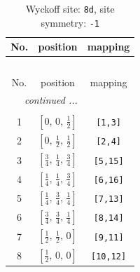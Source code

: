 \documentclass[fleqn,8pt]{jsarticle}
\begin{document}
\begin{longtable}{ccc}
\caption{Wyckoff site: {\tt 8d}, site symmetry: {\tt -1}}
 \\
 \hline \hline
No. & position & mapping \\ \hline \endfirsthead

\multicolumn{2}{l}{\tablename\ \thetable{}} \\
 \hline \hline
No. & position & mapping \\ \hline \endhead

 \hline \hline
\multicolumn{2}{r}{\footnotesize\it continued ...} \\ \endfoot

 \hline \hline
\multicolumn{2}{r}{} \\ \endlastfoot

1 & $\left[ 0,\, 0,\, \frac{1}{2} \right]$ & {\tt [1,3]} \\ \hline
2 & $\left[ 0,\, \frac{1}{2},\, \frac{1}{2} \right]$ & {\tt [2,4]} \\ \hline
3 & $\left[ \frac{3}{4},\, \frac{1}{4},\, \frac{3}{4} \right]$ & {\tt [5,15]} \\ \hline
4 & $\left[ \frac{1}{4},\, \frac{1}{4},\, \frac{3}{4} \right]$ & {\tt [6,16]} \\ \hline
5 & $\left[ \frac{1}{4},\, \frac{3}{4},\, \frac{1}{4} \right]$ & {\tt [7,13]} \\ \hline
6 & $\left[ \frac{3}{4},\, \frac{3}{4},\, \frac{1}{4} \right]$ & {\tt [8,14]} \\ \hline
7 & $\left[ \frac{1}{2},\, \frac{1}{2},\, 0 \right]$ & {\tt [9,11]} \\ \hline
8 & $\left[ \frac{1}{2},\, 0,\, 0 \right]$ & {\tt [10,12]} \\
\end{longtable}
\renewcommand{\arraystretch}{1.2}
\end{document}
